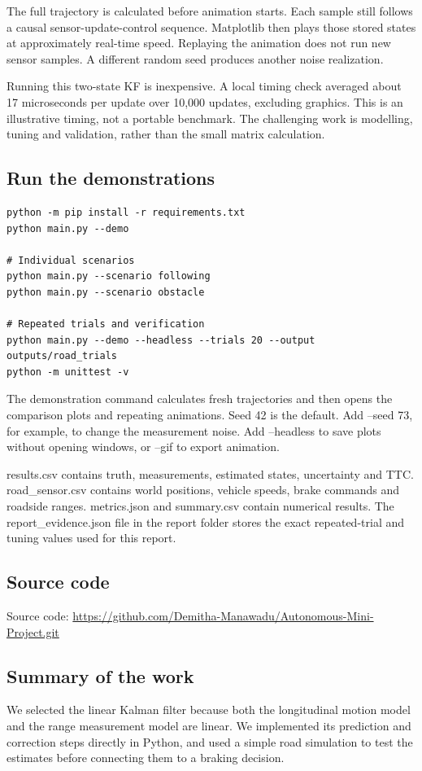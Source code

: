 \documentclass[11pt,a4paper]{article}
\begin{document}
The full trajectory is calculated before animation starts. Each sample still follows a causal sensor-update-control sequence. Matplotlib then plays those stored states at approximately real-time speed. Replaying the animation does not run new sensor samples. A different random seed produces another noise realization.\par

Running this two-state KF is inexpensive. A local timing check averaged about 17 microseconds per update over 10,000 updates, excluding graphics. This is an illustrative timing, not a portable benchmark. The challenging work is modelling, tuning and validation, rather than the small matrix calculation.\par

\clearpage
{}\subsection{Run the demonstrations}
\begin{lstlisting}
python -m pip install -r requirements.txt
python main.py --demo

# Individual scenarios
python main.py --scenario following
python main.py --scenario obstacle

# Repeated trials and verification
python main.py --demo --headless --trials 20 --output outputs/road_trials
python -m unittest -v
\end{lstlisting}
The demonstration command calculates fresh trajectories and then opens the comparison plots and repeating animations. Seed 42 is the default. Add --seed 73, for example, to change the measurement noise. Add --headless to save plots without opening windows, or --gif to export animation.\par

results.csv contains truth, measurements, estimated states, uncertainty and TTC. road\_\allowbreak{}sensor.csv contains world positions, vehicle speeds, brake commands and roadside ranges. metrics.json and summary.csv contain numerical results. The report\_\allowbreak{}evidence.json file in the report folder stores the exact repeated-trial and tuning values used for this report.\par

\subsection{Source code}
\noindent Source code: \url{https://github.com/Demitha-Manawadu/Autonomous-Mini-Project.git}\par
{}\subsection{Summary of the work}
We selected the linear Kalman filter because both the longitudinal motion model and the range measurement model are linear. We implemented its prediction and correction steps directly in Python, and used a simple road simulation to test the estimates before connecting them to a braking decision.\par
\end{document}
